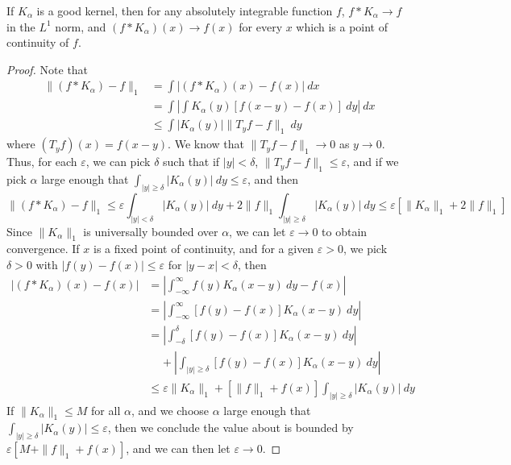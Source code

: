 \begin{theorem}
    If $K_\alpha$ is a good kernel, then for any absolutely integrable function $f$, $f * K_\alpha \to f$ in the $L^1$ norm, and $(f * K_\alpha)(x) \to f(x)$ for every $x$ which is a point of continuity of $f$.
\end{theorem}
\begin{proof}
    Note that
    \begin{align*}
        \| (f * K_\alpha) - f \|_1 &= \int |(f * K_\alpha)(x) - f(x)|\ dx\\
        &= \int \left| \int K_\alpha(y) [f(x - y) - f(x)]\ dy \right|\ dx\\
        &\leq \int |K_\alpha(y)| \| T_y f - f \|_1\ dy
    \end{align*}
    where $(T_y f)(x) = f(x - y)$. We know that $\| T_y f - f \|_1 \to 0$ as $y \to 0$. Thus, for each $\varepsilon$, we can pick $\delta$ such that if $|y| < \delta$, $\| T_y f - f \|_1 \leq \varepsilon$, and if we pick $\alpha$ large enough that $\int_{|y| \geq \delta} |K_\alpha(y)|\ dy \leq \varepsilon$, and then
    \[ \| (f * K_\alpha) - f \|_1 \leq \varepsilon \int_{|y| < \delta} |K_\alpha(y)|\ dy + 2 \| f \|_1 \int_{|y| \geq \delta} |K_\alpha(y)|\ dy \leq \varepsilon[\| K_\alpha \|_1 + 2 \| f \|_1] \]
    Since $\| K_\alpha \|_1$ is universally bounded over $\alpha$, we can let $\varepsilon \to 0$ to obtain convergence. If $x$ is a fixed point of continuity, and for a given $\varepsilon > 0$, we pick $\delta > 0$ with $|f(y) - f(x)| \leq \varepsilon$ for $|y - x| < \delta$, then
    \begin{align*}
        |(f * K_\alpha)(x) - f(x)| &= \left| \int_{-\infty}^\infty f(y) K_\alpha(x - y)\ dy - f(x) \right|\\
        &= \left| \int_{-\infty}^\infty [f(y) - f(x)] K_\alpha(x-y)\ dy \right|\\
        &= \left| \int_{-\delta}^\delta [f(y) - f(x)] K_\alpha(x-y)\ dy \right|\\
        &\ \ \ \ \ + \left| \int_{|y| \geq \delta} [f(y) - f(x)] K_\alpha(x - y)\ dy \right|\\
        &\leq \varepsilon \| K_\alpha \|_1 + [\| f \|_1 + f(x)] \int_{|y| \geq \delta} |K_\alpha(y)|\ dy
    \end{align*}
    If $\| K_\alpha \|_1 \leq M$ for all $\alpha$, and we choose $\alpha$ large enough that $\int_{|y| \geq \delta} |K_\alpha(y)| \leq \varepsilon$, then we conclude the value about is bounded by $\varepsilon [M + \| f \|_1 + f(x)]$, and we can then let $\varepsilon \to 0$.
\end{proof}

